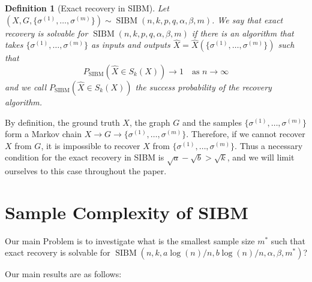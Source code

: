 \documentclass[conference]{IEEEtran}
\newtheorem{definition}{Definition}%
\DeclareMathOperator{\SIBM}{SIBM}
\begin{document}
\begin{definition}[Exact recovery in SIBM]
Let $(X,G,\{\sigma^{(1)},\dots,\sigma^{(m)}\}) \sim \SIBM(n,k,p,q,\alpha,\beta,m)$.
We say that exact recovery is solvable for $\SIBM(n,k,p,q,\alpha,\beta,m)$ if there is an algorithm that takes $\{\sigma^{(1)},\dots,\sigma^{(m)}\}$ as inputs and outputs $\hat{X}=\hat{X}(\{\sigma^{(1)},\dots,\sigma^{(m)}\})$ such that
$$
P_{\SIBM}(\hat{X} \in S_k(X)) \to 1
\text{~~~as~} n\to\infty
$$
and we call $P_{\SIBM}(\hat{X} \in S_k(X))$ the success probability of the recovery algorithm.
\end{definition}

By definition, the ground truth $X$, the graph $G$ and the samples $\{\sigma^{(1)},\dots,\sigma^{(m)}\}$ form a Markov chain $X\to G\to \{\sigma^{(1)},\dots,\sigma^{(m)}\}$. Therefore, if we cannot recover $X$ from $G$, it is impossible to recover $X$ from $\{\sigma^{(1)},\dots,\sigma^{(m)}\}$. Thus a necessary condition for the exact recovery in SIBM is $\sqrt{a}-\sqrt{b}> \sqrt{k}$, and we will limit ourselves to this case throughout the paper.

\section{Sample Complexity of SIBM}\label{s:trans}
Our main Problem is to investigate what is the smallest sample size $m^\ast$ such that exact recovery is solvable for $\SIBM(n,k, a\log(n)/n, b\log(n)/n,\alpha,\beta,m^\ast)$?

Our main results are as follows:
\end{document}
